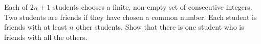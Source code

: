 Each of $2n+1$ students chooses a finite, non-empty set of consecutive integers.
Two students are friends if they have chosen a common number.
Each student is friends with at least $n$ other students.
Show that there is one student who is friends with all the others.

